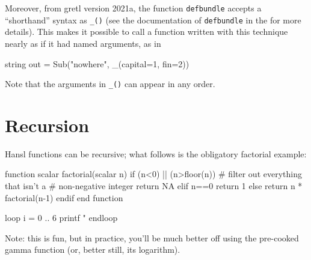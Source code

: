 Moreover, from gretl version 2021a, the function \texttt{defbundle}
accepts a ``shorthand'' syntax as \verb|_()| (see the documentation of
\texttt{defbundle} in the \GCR{} for more details). This makes it
possible to call a function written with this technique nearly as if
it had named arguments, as in
\begin{code}
  string out = Sub("nowhere", _(capital=1, fin=2))
\end{code}
Note that the arguments in \verb|_()| can appear in any order.

\section{Recursion}

Hansl functions can be recursive; what follows is the obligatory
factorial example:
\begin{code}
function scalar factorial(scalar n)
    if (n<0) || (n>floor(n))
        # filter out everything that isn't a 
        # non-negative integer
        return NA
    elif n==0
        return 1
    else
        return n * factorial(n-1)
    endif
end function

loop i = 0 .. 6
    printf "%
endloop
\end{code}

Note: this is fun, but in practice, you'll be much better off using
the pre-cooked gamma function (or, better still, its logarithm).

